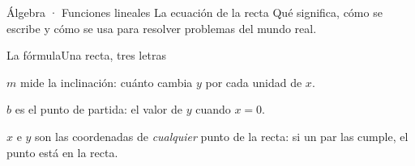 \documentclass[12pt]{article}
\begin{document}
\mwmodportada
  {Álgebra · Funciones lineales}
  {La ecuación de la recta}
  {Qué significa, cómo se escribe y cómo se usa para resolver
   problemas del mundo real.}

\begin{mwmodlamina}[mwprimario]{La fórmula}{Una recta, tres letras}
\begin{mwcajaformula}
\end{mwcajaformula}

\begin{mwcaja}
  \noindent
  \begin{minipage}[t]{4.1cm}
    {\nxheav\fontsize{11}{11}\selectfont\color{mwprimario}$m$}\quad
    {\mwsmall mide la inclinación: cuánto cambia $y$ por cada
    unidad de $x$.}
  \end{minipage}\hfill
  \begin{minipage}[t]{4.1cm}
    {\nxheav\fontsize{11}{11}\selectfont\color{mwprimario}$b$}\quad
    {\mwsmall es el punto de partida: el valor de $y$ cuando
    $x=0$.}
  \end{minipage}
\end{mwcaja}

\begin{mwcajagris}
  {\mwsmall $x$ e $y$ son las coordenadas de \emph{cualquier}
  punto de la recta: si un par las cumple, el punto está en la recta.}
\end{mwcajagris}
\end{mwmodlamina}
\end{document}
